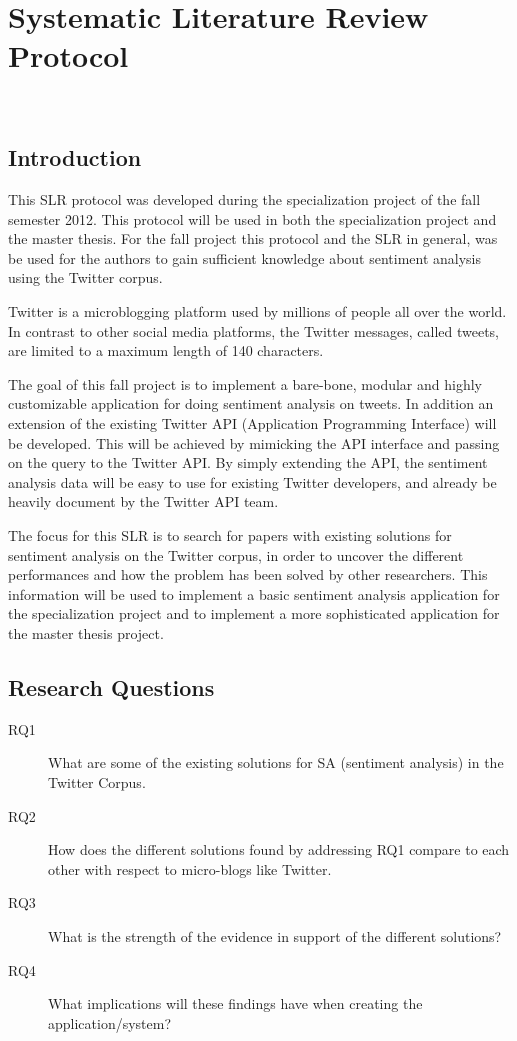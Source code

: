 
\chapter{Systematic Literature Review Protocol}~\label{apx:slrp}

\section{Introduction}

This SLR protocol was developed during the specialization project of the fall semester 2012. This protocol will be used in both the specialization project and the master thesis. For the fall project this protocol and the SLR in general, was be used for the authors to gain sufficient knowledge about sentiment analysis using the Twitter corpus.  

Twitter is a microblogging platform used by millions of people all over the world. In contrast to other social media platforms, the Twitter messages, called tweets, are limited to a maximum length of 140 characters.

The goal of this fall project is to implement a bare-bone, modular and highly customizable application for doing sentiment analysis on tweets. In addition an extension of the existing Twitter API (Application Programming Interface) will be developed. This will be achieved by mimicking the API interface and passing on the query to the Twitter API. By simply extending the API, the sentiment analysis data will be easy to use for existing Twitter developers, and already be heavily document by the Twitter API team. 

The focus for this SLR is to search for papers with existing solutions for sentiment analysis on the Twitter corpus, in order to uncover the different performances and how the problem has been solved by other researchers. This information will be used to implement a basic sentiment analysis application for the specialization project and to implement a more sophisticated application for the master thesis project. 

\section{Research Questions}

\begin{description}

\item[RQ1] What are some of the existing solutions for SA (sentiment analysis) in the Twitter Corpus.
\item[RQ2] How does the different solutions found by addressing RQ1 compare to each other with respect to micro-blogs like Twitter.
\item[RQ3] What is the strength of the evidence in support of the different solutions?
\item[RQ4] What implications will these findings have when creating the application/system?

\end{description}

